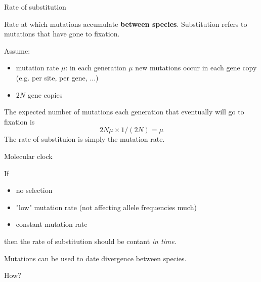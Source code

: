 \begin{frame}{Rate of substitution}

	\small
	\begin{block}
	Rate at which mutations accumulate \textbf{between species}. 
	Substitution refers to mutations that have gone to fixation. 
	\end{block}

	\vskip 0.3cm

	Assume:
	\begin{itemize}
		\item mutation rate $\mu$: in each generation $\mu$ new mutations occur in each gene copy (e.g. per site, per gene, ...)
		\item $2N$ gene copies
	\end{itemize}

	\pause

	The expected number of mutations each generation that eventually will go to fixation is
	\begin{equation*}
		2N\mu \times 1/(2N) = \mu
	\end{equation*}
	The rate of substituion is simply the mutation rate.

\end{frame}


\begin{frame}{Molecular clock}

	If
	\begin{itemize}
		\item no selection
		\item "low" mutation rate (not affecting allele frequencies much)
		\item constant mutation rate
	\end{itemize}
	then the rate of substitution should be contant \textit{in time}.

	\bigskip

	\begin{block}{}
		Mutations can be used to date divergence between species.
	\end{block}
	How?

\end{frame}



